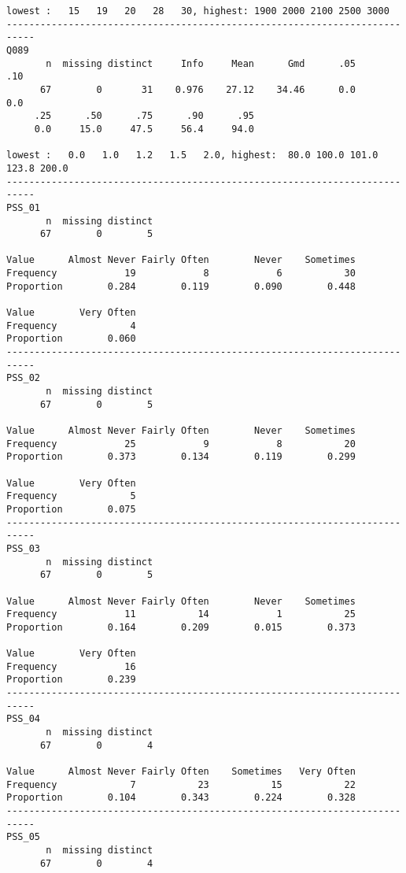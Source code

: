 \documentclass[]{article}
\begin{document}
\begin{verbatim}
lowest :   15   19   20   28   30, highest: 1900 2000 2100 2500 3000
---------------------------------------------------------------------------
Q089 
       n  missing distinct     Info     Mean      Gmd      .05      .10 
      67        0       31    0.976    27.12    34.46      0.0      0.0 
     .25      .50      .75      .90      .95 
     0.0     15.0     47.5     56.4     94.0 

lowest :   0.0   1.0   1.2   1.5   2.0, highest:  80.0 100.0 101.0 123.8 200.0
---------------------------------------------------------------------------
PSS_01 
       n  missing distinct 
      67        0        5 
                                                              
Value      Almost Never Fairly Often        Never    Sometimes
Frequency            19            8            6           30
Proportion        0.284        0.119        0.090        0.448
                       
Value        Very Often
Frequency             4
Proportion        0.060
---------------------------------------------------------------------------
PSS_02 
       n  missing distinct 
      67        0        5 
                                                              
Value      Almost Never Fairly Often        Never    Sometimes
Frequency            25            9            8           20
Proportion        0.373        0.134        0.119        0.299
                       
Value        Very Often
Frequency             5
Proportion        0.075
---------------------------------------------------------------------------
PSS_03 
       n  missing distinct 
      67        0        5 
                                                              
Value      Almost Never Fairly Often        Never    Sometimes
Frequency            11           14            1           25
Proportion        0.164        0.209        0.015        0.373
                       
Value        Very Often
Frequency            16
Proportion        0.239
---------------------------------------------------------------------------
PSS_04 
       n  missing distinct 
      67        0        4 
                                                              
Value      Almost Never Fairly Often    Sometimes   Very Often
Frequency             7           23           15           22
Proportion        0.104        0.343        0.224        0.328
---------------------------------------------------------------------------
PSS_05 
       n  missing distinct 
      67        0        4 
                                                              

\end{verbatim}
\end{document}
